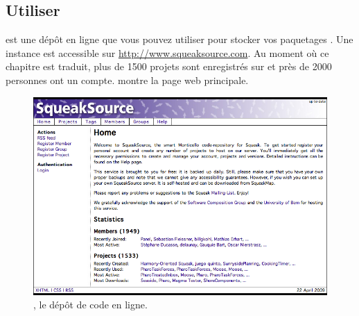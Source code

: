 \documentclass[a4paper,10pt,twoside]{book}
\begin{document}



\subsection{Utiliser \sqsrc}

\indmain{\sqsrc} est une dépôt en ligne que vous pouvez utiliser pour
stocker vos paquetages \MC. Une instance est accessible sur
\url{http://www.squeaksource.com}.
Au moment où ce chapitre est traduit, plus de 1500 projets sont
enregistrés sur \sqsrc et près de 2000 personnes ont un compte.
 montre la page web principale.

\begin{figure}[ht]\centering
	\includegraphics[width=\textwidth]{squeaksource2}
	\caption{\sqsrc, le dépôt de code \MC en ligne.}
\end{figure}

\end{document}
